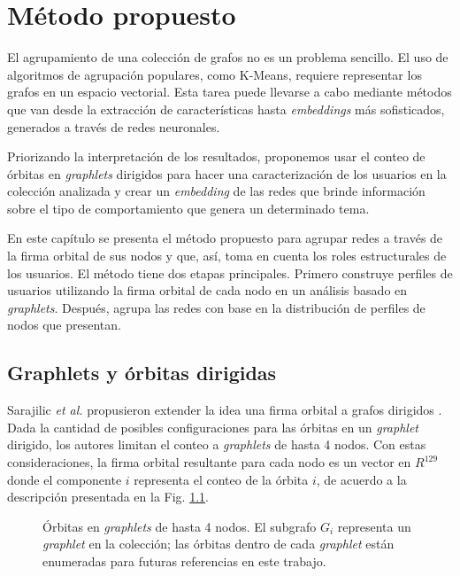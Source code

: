 %
\chapter{Método propuesto}
\label{chapter:4}


El agrupamiento de una colección de grafos no es un problema sencillo. El uso de algoritmos de agrupación populares, como K-Means, requiere representar los grafos en un espacio vectorial. Esta tarea puede llevarse a cabo mediante métodos que van desde la extracción de características hasta \textit{embeddings} más sofisticados, generados a través de redes neuronales. 

Priorizando la interpretación de los resultados, proponemos usar el conteo de órbitas en \textit{graphlets} dirigidos para hacer una caracterización de los usuarios en la colección analizada y crear un \textit{embedding} de las redes que brinde información sobre el tipo de comportamiento que genera un determinado tema. 

En este capítulo se presenta el método propuesto para agrupar redes a través de la firma orbital de sus nodos y que, así, toma en cuenta los roles estructurales de los usuarios. El método tiene dos etapas principales. Primero construye perfiles de usuarios utilizando la firma orbital de cada nodo en un análisis basado en \textit{graphlets}. Después, agrupa las redes con base en la distribución de perfiles de nodos que presentan. 

\section{Graphlets y órbitas dirigidas}
Sarajilic \textit{et al.} propusieron extender la idea una firma orbital a grafos dirigidos \cite{sarajlic_graphlet-based_2016}. Dada la cantidad de posibles configuraciones para las órbitas en un \textit{graphlet} dirigido, los autores limitan el conteo a \textit{graphlets} de hasta 4 nodos. Con estas consideraciones, la firma orbital resultante para cada nodo es un vector en $R^{129}$ donde el componente $i$ representa el conteo de la órbita $i$, de acuerdo a la descripción presentada en la Fig. \ref{fig:orbits}.

 \begin{figure}[htbp]
   \centering
   
    \caption{Órbitas en \textit{graphlets} de hasta 4 nodos. El subgrafo $G_i$ representa un \textit{graphlet} en la colección; las órbitas dentro de cada \textit{graphlet} están enumeradas para futuras referencias en este trabajo. }
    \label{fig:orbits}
\end{figure}


